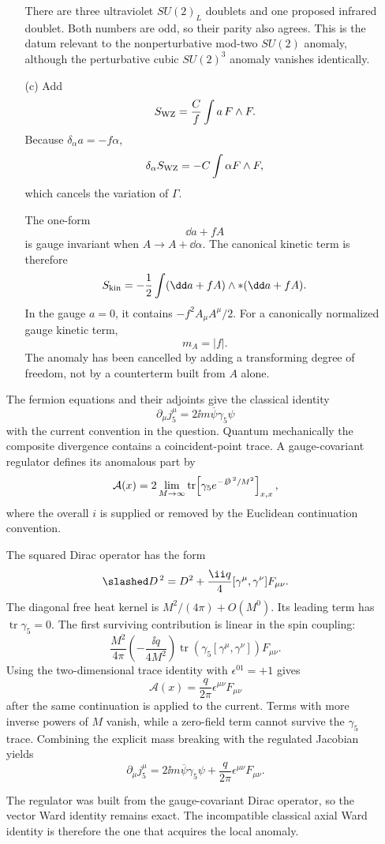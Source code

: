 \begin{enumerate}
\begin{enumerate}
    There are three ultraviolet \(SU(2)_L\) doublets and one proposed
    infrared doublet.  Both numbers are odd, so their parity also agrees.
    This is the datum relevant to the nonperturbative mod-two \(SU(2)\)
    anomaly, although the perturbative cubic \(SU(2)^3\) anomaly vanishes
    identically.
    \item[(c)]
    Add
    \[
      S_{\rm WZ}=\frac{C}{f}\int a\,F\wedge F.
    \]
    Because \(\delta_\alpha a=-f\alpha\),
    \[
      \delta_\alpha S_{\rm WZ}
        =-C\int\alpha F\wedge F,
    \]
    which cancels the variation of \(\Gamma\).

    The one-form
    \[
      \dd a+fA
    \]
    is gauge invariant when \(A\to A+\dd\alpha\).  The canonical kinetic
    term is therefore
    \[
      S_{\rm kin}=-\frac12\int(\dd a+fA)\wedge{*}(\dd a+fA).
    \]
    In the gauge \(a=0\), it contains
    \(-f^2A_\mu A^\mu/2\).  For a canonically normalized gauge kinetic
    term,
    \[
      \boxed{m_A=|f|.}
    \]
    The anomaly has been cancelled by adding a transforming degree of
    freedom, not by a counterterm built from \(A\) alone.
  \end{enumerate}

  The fermion equations and their adjoints give the classical identity
  \[
    \partial_\mu j_5^\mu
      =2\ii m\overline\psi\gamma_5\psi
  \]
  with the current convention in the question.  Quantum mechanically the
  composite divergence contains a coincident-point trace.  A
  gauge-covariant regulator defines its anomalous part by
  \[
    \mathcal A(x)
      =2\lim_{M\to\infty}
       \operatorname{tr}\!
       \left[\gamma_5e^{-\slashed D^{\,2}/M^2}\right]_{x,x},
  \]
  where the overall \(i\) is supplied or removed by the Euclidean
  continuation convention.

  The squared Dirac operator has the form
  \[
    \slashed D^{\,2}
      =D^2+\frac{\ii q}{4}
        [\gamma^\mu,\gamma^\nu]F_{\mu\nu}.
  \]
  The diagonal free heat kernel is
  \(M^2/(4\pi)+O(M^0)\).  Its leading term has
  \(\operatorname{tr}\gamma_5=0\).  The first surviving contribution is
  linear in the spin coupling:
  \[
    \frac{M^2}{4\pi}
      \left(-\frac{\ii q}{4M^2}\right)
      \operatorname{tr}\!
       \left(\gamma_5[\gamma^\mu,\gamma^\nu]\right)F_{\mu\nu}.
  \]
  Using the two-dimensional trace identity with
  \(\epsilon^{01}=+1\) gives
  \[
    \boxed{\mathcal A(x)
      =\frac{q}{2\pi}\epsilon^{\mu\nu}F_{\mu\nu}}
  \]
  after the same continuation is applied to the current.  Terms with more
  inverse powers of \(M\) vanish, while a zero-field term cannot survive
  the \(\gamma_5\) trace.  Combining the explicit mass breaking with the
  regulated Jacobian yields
  \[
    \boxed{\partial_\mu j_5^\mu
      =2\ii m\overline\psi\gamma_5\psi
       +\frac{q}{2\pi}\epsilon^{\mu\nu}F_{\mu\nu}.}
  \]

  The regulator was built from the gauge-covariant Dirac operator, so the
  vector Ward identity remains exact.  The incompatible classical axial
  Ward identity is therefore the one that acquires the local anomaly.

\end{enumerate}
